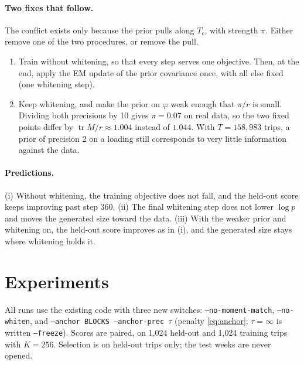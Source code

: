 \documentclass[11pt]{article}
\theoremstyle{remark}\newtheorem{remark}{Remark}
\begin{document}
\paragraph{Two fixes that follow.} The conflict exists only because the prior pulls along $T_c$,
with strength $\pi$. Either remove one of the two procedures, or remove the pull.
\begin{enumerate}
\item[(a)] Train without whitening, so that every step serves one objective. Then, at the end,
  apply the EM update of the prior covariance once, with all else fixed (one whitening step).
\item[(b)] Keep whitening, and make the prior on $\varphi$ weak enough that $\pi/r$ is small.
  Dividing both precisions by 10 gives $\pi=0.07$ on real data, so the two fixed points differ by
  $\operatorname{tr}M/r\approx1.004$ instead of $1.044$. With $T=158{,}983$ trips, a prior of
  precision 2 on a loading still corresponds to very little information against the data.
\end{enumerate}

\paragraph{Predictions.}
(i) Without whitening, the training objective does not fall, and the held-out score keeps
improving past step 360.
(ii) The final whitening step does not lower $\log p$ and moves the generated size toward the data.
(iii) With the weaker prior and whitening on, the held-out score improves as in (i), and the
generated size stays where whitening holds it.

\section{Experiments}\label{sec:exp}

All runs use the existing code with three new switches: \texttt{--no-moment-match},
\texttt{--no-whiten}, and \texttt{--anchor BLOCKS --anchor-prec $\tau$} (penalty
\eqref{eq:anchor}; $\tau=\infty$ is written \texttt{--freeze}). Scores are paired, on 1,024
held-out and 1,024 training trips with $K=256$. Selection is on held-out trips only; the test
weeks are never opened.
\end{document}
